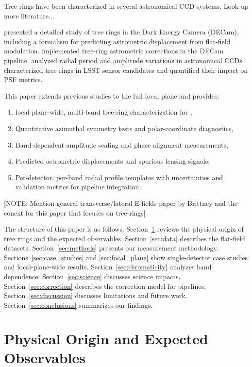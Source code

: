 Tree rings have been characterized in several astronomical CCD systems.  Look up more literature... 

 \citet{Plazas2014} presented a detailed study of tree rings in the Dark Energy Camera (DECam), including a formalism for predicting astrometric displacement from flat-field modulation. \citet{Bernstein2017} implemented tree-ring astrometric corrections in the DECam pipeline. \citet{Park2020} analyzed radial period and amplitude variations in astronomical CCDs. \citet{Esteves2023} characterized tree rings in LSST sensor candidates and quantified their impact on PSF metrics.


This paper extends previous studies to the full \lsstcam{} focal plane and provides:

\begin{enumerate}
\item focal-plane-wide, multi-band tree-ring characterization for \lsstcam,
\item Quantitative azimuthal symmetry tests and polar-coordinate diagnostics,
\item Band-dependent amplitude scaling and phase alignment measurements,
\item Predicted astrometric displacements and spurious lensing signals,
\item Per-detector, per-band radial profile templates with uncertainties and validation metrics for pipeline integration.
\end{enumerate}


[NOTE: Mention general transverse/lateral E-fields paper by Brittney and the conext for this paper that focuses on tree-rings]

The structure of this paper is as follows. Section~\ref{sec:physics} reviews the physical origin of tree rings and the expected observables. Section~\ref{sec:data} describes the flat-field datasets. Section~\ref{sec:methods} presents our measurement methodology. Sections~\ref{sec:case_studies} and \ref{sec:focal_plane} show single-detector case studies and focal-plane-wide results. Section~\ref{sec:chromaticity} analyzes band dependence. Section~\ref{sec:science} discusses science impacts. Section~\ref{sec:correction} describes the correction model for pipelines. Section~\ref{sec:discussion} discusses limitations and future work. Section~\ref{sec:conclusions} summarizes our findings.

\section{Physical Origin and Expected Observables} \label{sec:physics}

